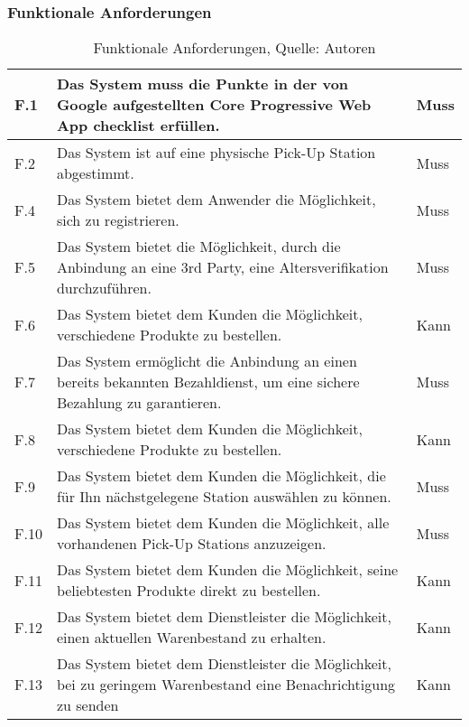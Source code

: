 \subsubsection{Funktionale Anforderungen}
\begin{table}[H]
	\setlength\extrarowheight{2pt} %
	\begin{tabularx}{\textwidth}{|l|X|l|}
		\hline
		F.1 & Das System muss die Punkte in der von Google aufgestellten Core Progressive Web App checklist erfüllen. \cite{pwaChecklist} & Muss \\
		\hline
		F.2 & Das System ist auf eine physische Pick-Up Station abgestimmt. & Muss \\

		\hline
		F.4 & Das System bietet dem Anwender die Möglichkeit, sich zu registrieren. & Muss \\
		\hline
		F.5 & Das System bietet die Möglichkeit, durch die Anbindung an eine 3rd Party, eine Altersverifikation durchzuführen.  & Muss \\
		\hline
		F.6 & Das System bietet dem Kunden die Möglichkeit, verschiedene Produkte zu bestellen. & Kann \\
		\hline
		F.7 & Das System ermöglicht die Anbindung an einen bereits bekannten Bezahldienst, um eine sichere Bezahlung zu garantieren. & Muss \\
		\hline
		F.8 & Das System bietet dem Kunden die Möglichkeit, verschiedene Produkte zu bestellen. & Kann \\
		\hline
		F.9 & Das System bietet dem Kunden die Möglichkeit, die für Ihn nächstgelegene Station auswählen zu können.  & Muss \\
		\hline
		F.10 & Das System bietet dem Kunden die Möglichkeit, alle vorhandenen Pick-Up Stations anzuzeigen.  & Muss \\
		\hline
		F.11 & Das System bietet dem Kunden die Möglichkeit, seine beliebtesten Produkte direkt zu bestellen. & Kann \\
		\hline
		F.12 & Das System bietet dem Dienstleister die Möglichkeit, einen aktuellen Warenbestand zu erhalten. & Kann \\
		\hline
		F.13 & Das System bietet dem Dienstleister die Möglichkeit, bei zu geringem Warenbestand eine Benachrichtigung zu senden & Kann \\
		
	\end{tabularx}
	\caption{ \label{tbl: FunktionaleAnforderungent}Funktionale Anforderungen, Quelle: Autoren}
\end{table}

